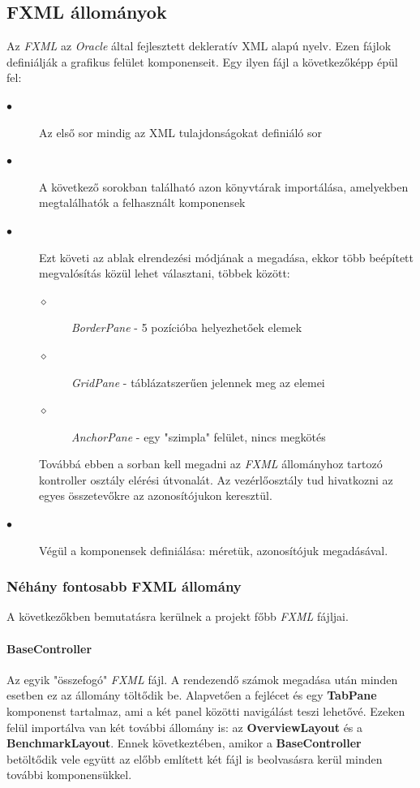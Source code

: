 \documentclass{elteikthesis}
\begin{document}
\subsection{FXML állományok}
Az \emph{FXML} az \emph{Oracle} által fejlesztett dekleratív XML alapú nyelv\cite{FXML}. Ezen fájlok definiálják a grafikus felület komponenseit. Egy ilyen fájl a következőképp épül fel:
\begin{description}
	\item[$\bullet$] Az első sor mindig az XML tulajdonságokat definiáló sor
	\item[$\bullet$] A következő sorokban található azon könyvtárak importálása, amelyekben megtalálhatók a felhasznált komponensek
	\item[$\bullet$] Ezt követi az ablak elrendezési módjának a megadása, ekkor több beépített megvalósítás közül lehet választani, többek között:
		\begin{description}
		\item[$\diamond$] \emph{BorderPane} - 5 pozícióba helyezhetőek elemek
		\item[$\diamond$] \emph{GridPane} - táblázatszerűen jelennek meg az elemei
		\item[$\diamond$] \emph{AnchorPane} - egy "szimpla" felület, nincs megkötés	
		\end{description}
	Továbbá ebben a sorban kell megadni az \emph{FXML} állományhoz tartozó kontroller osztály elérési útvonalát. Az vezérlőosztály tud hivatkozni az egyes összetevőkre az azonosítójukon keresztül.
	\item[$\bullet$] Végül a komponensek definiálása: méretük, azonosítójuk megadásával.
\end{description}
\subsubsection{Néhány fontosabb FXML állomány}
A következőkben bemutatásra kerülnek a projekt főbb \emph{FXML} fájljai.
\paragraph{BaseController}
Az egyik "összefogó" \emph{FXML} fájl. A rendezendő számok megadása után minden esetben ez az állomány töltődik be. Alapvetően a fejlécet és egy \textbf{TabPane} komponenst tartalmaz, ami a két panel közötti navigálást teszi lehetővé. Ezeken felül importálva van két további állomány is: az \textbf{OverviewLayout} és a \textbf{BenchmarkLayout}. Ennek következtében, amikor a \textbf{BaseController} betöltődik vele együtt az előbb említett két fájl is beolvasásra kerül minden további komponensükkel.
\end{document}
